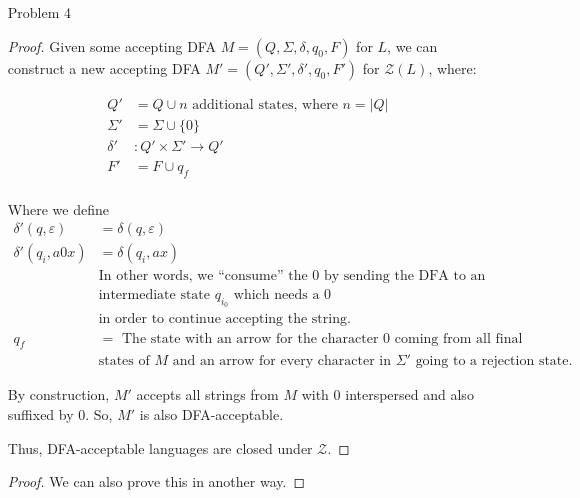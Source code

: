 \documentclass[12pt,letterpaper]{article}
\begin{document}
\begin{enumerate}
\begin{proof}
        But we know that each of these intersections is DFA-acceptable,
        so \textbf{maj}($L_1,L_2,L_3$) is DFA-acceptable.
      \end{proof}

    \item[Problem 4]
      \begin{proof}
        Given some accepting DFA $M = (Q, \Sigma, \delta, q_0, F)$ for $L$,
        we can construct a new accepting DFA $M' = (Q', \Sigma', \delta', q_0, F')$ for $\mathcal{Z}(L)$, where:

        \begin{align*}
          Q' &= Q \cup n \text{ additional states, where } n = |Q| \\
          \Sigma' &= \Sigma \cup \{0\} \\
          \delta' &: Q' \times \Sigma' \rightarrow Q' \\
          F' &= F \cup q_f\\
        \end{align*}

        Where we define
        \begin{align*}
          \delta'(q, \varepsilon) &= \delta(q, \varepsilon) \\
          \delta'(q_i, a0x) &= \delta(q_i, ax) \\
          & \text{In other words, we ``consume'' the } 0 \text{ by sending the DFA to an }\\
          & \text{intermediate state } q_{i_0} \text{ which needs a } 0 \\
          & \text{in order to continue accepting the string.} \\
          q_f &= \text{ The state with an arrow for the character } 0 \text{ coming from all final}\\
          & \text{states of } M \text{ and an arrow for every character in } \Sigma' \text{ going to a rejection state.}
        \end{align*}

        By construction, $M'$ accepts all strings from $M$ with $0$ interspersed and also suffixed by $0$.
        So, $M'$ is also DFA-acceptable.

        Thus, DFA-acceptable languages are closed under $\mathcal{Z}$.
      \end{proof}

      \begin{proof}
        We can also prove this in another way.


\end{proof}
\end{enumerate}
\end{document}
